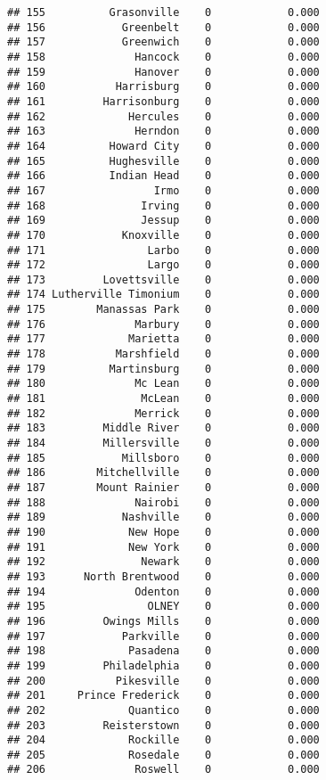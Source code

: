 \documentclass[]{article}
\begin{document}
\begin{verbatim}
## 155          Grasonville    0            0.000
## 156            Greenbelt    0            0.000
## 157            Greenwich    0            0.000
## 158              Hancock    0            0.000
## 159              Hanover    0            0.000
## 160           Harrisburg    0            0.000
## 161         Harrisonburg    0            0.000
## 162             Hercules    0            0.000
## 163              Herndon    0            0.000
## 164          Howard City    0            0.000
## 165          Hughesville    0            0.000
## 166          Indian Head    0            0.000
## 167                 Irmo    0            0.000
## 168               Irving    0            0.000
## 169               Jessup    0            0.000
## 170            Knoxville    0            0.000
## 171                Larbo    0            0.000
## 172                Largo    0            0.000
## 173         Lovettsville    0            0.000
## 174 Lutherville Timonium    0            0.000
## 175        Manassas Park    0            0.000
## 176              Marbury    0            0.000
## 177             Marietta    0            0.000
## 178           Marshfield    0            0.000
## 179          Martinsburg    0            0.000
## 180              Mc Lean    0            0.000
## 181               McLean    0            0.000
## 182              Merrick    0            0.000
## 183         Middle River    0            0.000
## 184         Millersville    0            0.000
## 185            Millsboro    0            0.000
## 186        Mitchellville    0            0.000
## 187        Mount Rainier    0            0.000
## 188              Nairobi    0            0.000
## 189            Nashville    0            0.000
## 190             New Hope    0            0.000
## 191             New York    0            0.000
## 192               Newark    0            0.000
## 193      North Brentwood    0            0.000
## 194              Odenton    0            0.000
## 195                OLNEY    0            0.000
## 196         Owings Mills    0            0.000
## 197            Parkville    0            0.000
## 198             Pasadena    0            0.000
## 199         Philadelphia    0            0.000
## 200           Pikesville    0            0.000
## 201     Prince Frederick    0            0.000
## 202             Quantico    0            0.000
## 203         Reisterstown    0            0.000
## 204             Rockille    0            0.000
## 205             Rosedale    0            0.000
## 206              Roswell    0            0.000

\end{verbatim}
\end{document}

